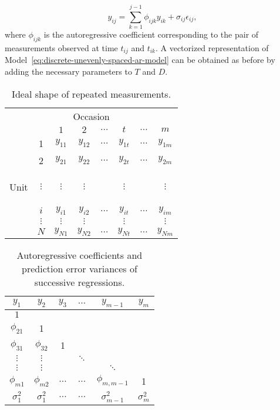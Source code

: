 \documentclass[12pt]{article}
\theoremstyle{definition}
\begin{document}
{{{{\begin{equation}
{y}_{ij}  = \sum_{k=1}^{j-1} \phi_{ijk} y_{ik} + \sigma_{ij}\epsilon_{ij}, \label{eq:discrete-unevenly-spaced-ar-model}
\end{equation}
\noindent
where $\phi_{ijk}$ is the autoregressive coefficient corresponding to the pair of measurements observed at time $t_{ij}$ and $t_{ik}$. A vectorized representation of Model~\ref{eq:discrete-unevenly-spaced-ar-model} can be obtained as before by adding the necessary parameters to $T$ and $D$.
\bigskip

\begin{table}\centering
\caption{Ideal shape of repeated measurements.}
\begin{tabular}{cc|cccccc}
\multicolumn{8}{c}{Occasion}\\
& & $1$&$2$ &  $\dots$ & $t$ & $\dots$ & $m$ \\ \midrule
& 1 & $y_{11}$&$y_{12}$ &$\dots$ & $y_{1t}$ & $\dots$& $y_{1m}$ \\
& 2 & $y_{21}$&$y_{22}$ &$\dots$ & $y_{2t}$ & $\dots$& $y_{2m}$ \\
\begin{rotate}{90}%
\mbox{Unit}\end{rotate} & $\vdots$ &$\vdots$&$\vdots$ & &$\vdots$ & & $\vdots$ \\
& $i$ & $y_{i1}$&$y_{i2}$ &$\dots$ & $y_{it}$ & $\dots$& $y_{im}$ \\
 & $\vdots$ &$\vdots$&$\vdots$ & &$\vdots$ & & $\vdots$ \\
 & $N$ & $y_{N1}$&$y_{N2}$ &$\dots$ & $y_{Nt}$ & $\dots$& $y_{Nm}$ \\
\end{tabular}
\end{table}


\begin{table}\centering
\caption{Autoregressive coefficients and prediction error variances of successive regressions.}
\begin{tabular}{cccccc}
 $y_{1}$&$y_{2}$ & $y_{3}$ & $\dots$ &$y_{m-1}$& $y_{m}$\\ \midrule
 $1$& &&&&\\
$\phi_{21}$& 1 &&&& \\
$\phi_{31}$& $\phi_{32}$& 1 &&& \\ 
$\vdots$ & $\vdots$ & & $\ddots$&& \\
$\vdots$ & $\vdots$ & && $\ddots$& \\
$\phi_{m1}$& $\phi_{m2}$&$\dots$ &$\dots$ &$\phi_{m,m-1}$ & 1\\ \midrule
$\sigma_1^2$ & $\sigma_1^2$ & $\dots$&$\dots$ &$\sigma_{m-1}^2$ &$\sigma_m^2$
\end{tabular}
\end{table}

}}}}
\end{document}
